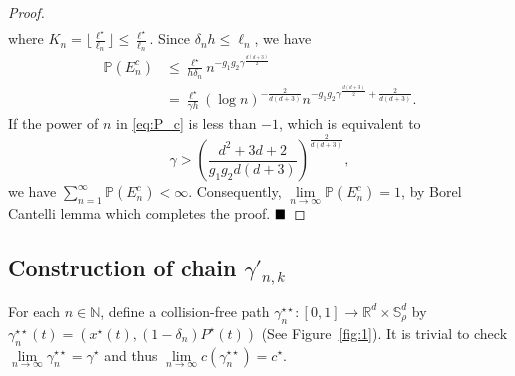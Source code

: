 \documentclass[Afour,sageh,times]{sagej}
\renewcommand{\qed}{\hfill\blacksquare}
\begin{document}
\begin{proof}
\begin{align}
\end{align}
where $K_n=\lfloor\frac{\ell^\star}{\ell_n}\rfloor\leq\frac{\ell^\star}{\ell_n}$.
Since $\delta_n h\leq \ell_n$, 
we have
\begin{align} \nonumber
    \mathbb{P}\left(E^c_{n}\right)
    &\leq \frac{ \ell^\star}{h \delta_n }  n^{- g_1 g_2 \gamma^{\frac{d(d+3)}{2}}}  \\ \label{eq:P_c} 
     &= \frac{ \ell^\star}{\gamma h} (\log n)^{-\frac{2}{d(d+3)}} n^{- g_1 g_2 \gamma^{\frac{d(d+3)}{2}}+ \frac{2}{d(d+3)}}. 
\end{align}
If the power of $n$ in \eqref{eq:P_c} is less than $-1$, which is equivalent to
\[
\gamma>\left(\frac{d^2+3d+2}{g_1 g_2 d(d+3)} \right)^\frac{2}{d(d+3)},
\]
we have $\sum_{n=1}^\infty  \mathbb{P}\left(E^c_{n}\right)<\infty$. Consequently, 
$\underset{n\rightarrow\infty}{\lim}\mathbb{P}\left(E^c_{n}\right)=1$,
by Borel Cantelli lemma \cite{grimmett2020probability} which completes the proof. $\qed$
\end{proof}

\subsection{Construction of chain \texorpdfstring{$\gamma'_{n,k}$}{g'}}
\label{subsec:gamma_def}
For each $n\in\mathbb{N}$, define a collision-free path $\gamma_n^{\star\star}: [0,1]\rightarrow \mathbb{R}^d\times \mathbb{S}_\rho^d$ by $\gamma_n^{\star\star}(t)=(x^\star(t), (1-\delta_n) P^\star(t))$ (See Figure~\ref{fig:1}).
It is trivial to check $ \underset{n\rightarrow\infty}{\lim} \gamma^{\star\star}_n = \gamma^\star$ and thus $\underset{n\rightarrow\infty}{\lim}c(\gamma^{\star\star}_n) = c^\star$.
\end{document}
